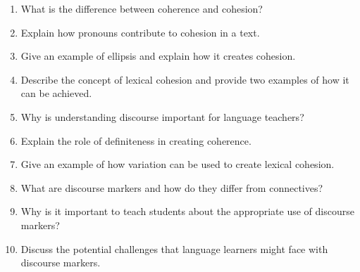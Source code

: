 \begin{tcolorbox}[title=Exercise: Short-Answer Questions, colback=white, colframe=blue!75!black, fonttitle=\bfseries]

\begin{enumerate}[noitemsep]
    \item What is the difference between coherence and cohesion?
    \item Explain how pronouns contribute to cohesion in a text.
    \item Give an example of ellipsis and explain how it creates cohesion.
    \item Describe the concept of lexical cohesion and provide two examples of how it can be achieved.
    \item Why is understanding discourse important for language teachers?
    \item Explain the role of definiteness in creating coherence.
    \item Give an example of how variation can be used to create lexical cohesion.
    \item What are discourse markers and how do they differ from connectives?
    \item Why is it important to teach students about the appropriate use of discourse markers?
    \item Discuss the potential challenges that language learners might face with discourse markers.
\end{enumerate}

\end{tcolorbox}

